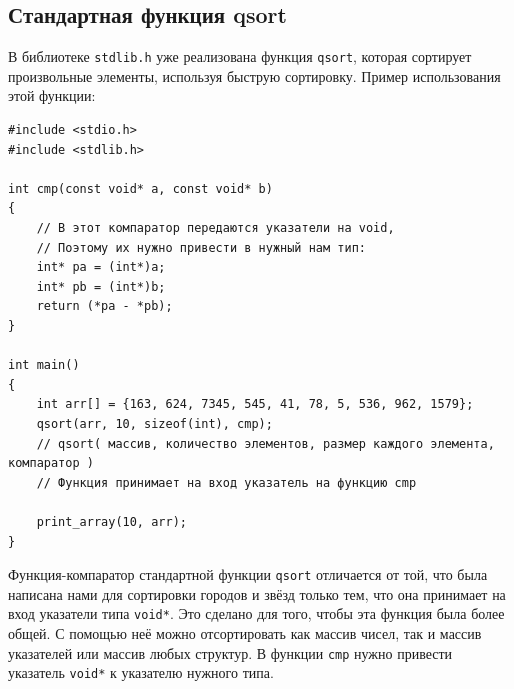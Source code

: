 \documentclass[10pt]{article}
\begin{document}

\subsection*{Стандартная функция qsort}

В библиотеке \texttt{stdlib.h} уже реализована функция \texttt{qsort}, которая сортирует произвольные элементы, используя быструю сортировку. Пример использования этой функции:
\begin{lstlisting}
#include <stdio.h>
#include <stdlib.h>

int cmp(const void* a, const void* b)
{
    // В этот компаратор передаются указатели на void,
    // Поэтому их нужно привести в нужный нам тип:
    int* pa = (int*)a;
    int* pb = (int*)b;
    return (*pa - *pb);
}

int main()
{
    int arr[] = {163, 624, 7345, 545, 41, 78, 5, 536, 962, 1579};
    qsort(arr, 10, sizeof(int), cmp);
    // qsort( массив, количество элементов, размер каждого элемента, компаратор )
    // Функция принимает на вход указатель на функцию cmp
   
    print_array(10, arr);
}
\end{lstlisting}
Функция-компаратор стандартной функции \texttt{qsort} отличается от той, что была написана нами для сортировки
городов и звёзд только тем, что она принимает на вход указатели типа \texttt{void*}. Это сделано для того, чтобы эта функция была более общей. С помощью неё можно отсортировать как массив чисел, так и массив указателей или массив любых структур. В функции \texttt{cmp} нужно привести указатель \texttt{void*} к указателю нужного типа.\\
\end{document}
